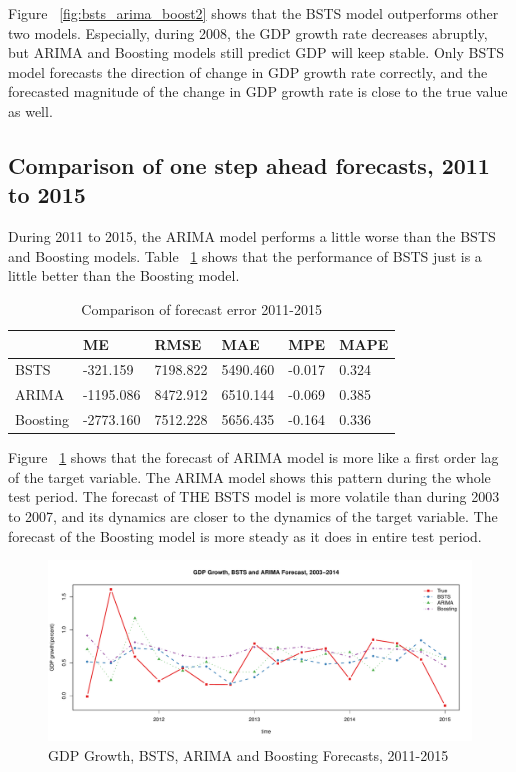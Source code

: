 Figure ~\ref{fig:bsts_arima_boost2} shows that the BSTS model outperforms other two models. Especially, during 2008, the GDP growth rate decreases abruptly, but ARIMA and Boosting models still predict GDP will keep stable. Only BSTS model forecasts the direction of change in GDP growth rate correctly,  and the forecasted magnitude of the change in GDP growth rate is close to the true value as well.  



\subsection{Comparison of one step ahead forecasts, 2011 to 2015}


During 2011 to 2015, the ARIMA model performs a little worse than the BSTS and Boosting models. Table ~\ref{ErrorCom3} shows that the performance of BSTS just is a little better than the Boosting model. 


\begin{table}[h]
	\centering
	\begin{tabular}{@{}llllll@{}}
		\toprule
		             & ME          & RMSE      & MAE       & MPE       & MAPE     \\ \midrule
		BSTS          & -321.159 & 7198.822 & 5490.460 & -0.017 & 0.324 \\
		ARIMA         & -1195.086 & 8472.912 & 6510.144 & -0.069 & 0.385 \\ 
		Boosting      & -2773.160 & 7512.228 & 5656.435 & -0.164 & 0.336\\ \bottomrule
	\end{tabular}
	\caption{Comparison of forecast error 2011-2015}
	\label{ErrorCom3}
\end{table}

Figure ~\ref{fig:bsts_arima_boost_3} shows that the forecast of ARIMA model is more like a first order lag of the target variable. The ARIMA model shows this pattern during the whole test period. The forecast of THE BSTS model is more volatile than during 2003 to 2007, and its dynamics are closer to the dynamics of the target variable. The forecast of the Boosting model is more steady as it does in entire test period. 

\begin{figure}[h]
	\centering
	\includegraphics[width=0.9\linewidth]{Figures/bsts_arima_boost_3}
	\caption{GDP Growth, BSTS, ARIMA and Boosting Forecasts, 2011-2015}
	\label{fig:bsts_arima_boost_3}
\end{figure}



